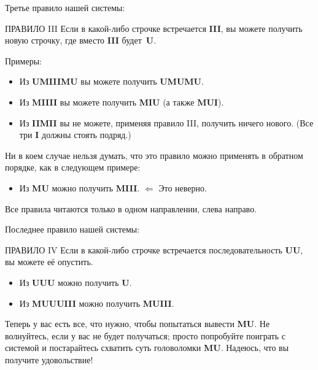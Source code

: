 \documentclass[../main.tex]{subfiles}
\begin{document}
Третье правило нашей системы:

\begin{mybox}{ПРАВИЛО III}
    Если в какой-либо строчке встречается \textbf{III}, вы можете получить новую строчку, где вместо \textbf{III} будет~\textbf{U}.
\end{mybox}

Примеры:

\begin{itemize}[label={}, noitemsep, topsep=6pt, leftmargin=\parindent]
    \item Из \textbf{UMIIIMU} вы можете получить \textbf{UMUMU}.
    \item Из \textbf{MIIII} вы можете получить \textbf{MIU} (а также \textbf{MUI}).
    \item Из \textbf{IIMII} вы не можете, применяя правило III, получить ничего нового. (Все три \textbf{I} должны стоять подряд.)
\end{itemize}

Ни в коем случае нельзя думать, что это правило можно применять в обратном порядке, как в следующем примере:

\begin{itemize}[label={}, noitemsep, topsep=6pt, leftmargin=\parindent]
    \item Из \textbf{MU} можно получить \textbf{MIII}. $\Leftarrow$ Это неверно.
\end{itemize}

Все правила читаются только в одном направлении, слева направо.

Последнее правило нашей системы:

\begin{mybox}{ПРАВИЛО IV}
    Если в какой-либо строчке встречается последовательность \textbf{UU}, вы можете её опустить.
\end{mybox}

\begin{itemize}[label={}, noitemsep, topsep=6pt, leftmargin=\parindent]
    \item Из \textbf{UUU} можно получить \textbf{U}.
    \item Из \textbf{MUUUIII} можно получить \textbf{MUIII}.
\end{itemize}

Теперь у вас есть все, что нужно, чтобы попытаться вывести \textbf{MU}.
Не волнуйтесь, если у вас не будет получаться; просто попробуйте поиграть с системой и постарайтесь схватить суть головоломки \textbf{MU}.
Надеюсь, что вы получите удовольствие!
\end{document}
